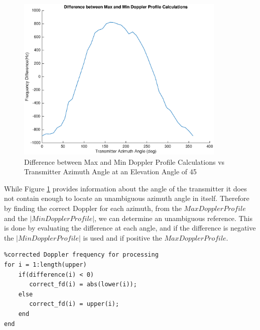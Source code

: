  \begin{figure}[b]
	\begin{center}
		\includegraphics[width=10cm]{images/results/Azimuth_angle_estimation_difference.eps}
		\caption{Difference between Max and Min Doppler Profile Calculations vs Transmitter Azimuth Angle at an Elevation Angle of 45\textdegree}
		\label{fig:azimuth_estimation_difference}
	\end{center}
\end{figure}

While Figure \ref{fig:azimuth_estimation_difference} provides information about the angle of the transmitter it does not contain enough to locate an unambiguous azimuth angle in itself. Therefore by finding the correct Doppler for each azimuth, from the $Max Doppler Profile$ and the $| Min Doppler Profile |$, we can determine an unambiguous reference. This is done by evaluating the difference at each angle, and if the difference is negative the $| Min Doppler Profile |$ is used and if positive the $Max Doppler Profile$.

\begin{lstlisting}
%corrected Doppler frequency for processing
for i = 1:length(upper)
    if(difference(i) < 0)
       correct_fd(i) = abs(lower(i));
    else
       correct_fd(i) = upper(i);
    end
end
\end{lstlisting}

